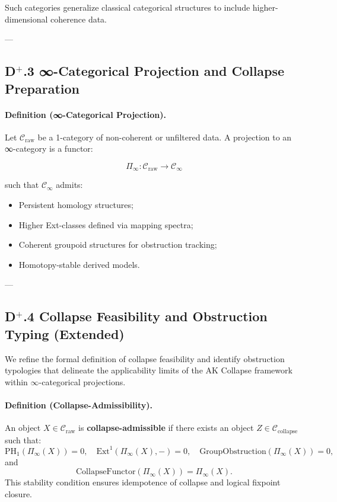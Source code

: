 \documentclass[11pt]{article}
\begin{document}
Such categories generalize classical categorical structures to include higher-dimensional coherence data.

---

\subsection*{D$^{+}$.3 ∞-Categorical Projection and Collapse Preparation}

\paragraph{Definition (∞-Categorical Projection).}

Let $\mathcal{C}_{\mathrm{raw}}$ be a 1-category of non-coherent or unfiltered data. A projection to an ∞-category is a functor:

\[
\Pi_\infty : \mathcal{C}_{\mathrm{raw}} \to \mathcal{C}_\infty
\]

such that $\mathcal{C}_\infty$ admits:

\begin{itemize}
    \item Persistent homology structures;
    \item Higher Ext-classes defined via mapping spectra;
    \item Coherent groupoid structures for obstruction tracking;
    \item Homotopy-stable derived models.
\end{itemize}

---

\subsection*{D$^{+}$.4 Collapse Feasibility and Obstruction Typing (Extended)}

We refine the formal definition of collapse feasibility and identify obstruction typologies that delineate the applicability limits of the AK Collapse framework within $\infty$-categorical projections.

\paragraph{Definition (Collapse-Admissibility).}

An object \( X \in \mathcal{C}_{\mathrm{raw}} \) is \textbf{collapse-admissible} if there exists an object \( Z \in \mathcal{C}_{\mathrm{collapse}} \) such that:
\[
\mathrm{PH}_1(\Pi_\infty(X)) = 0, \quad
\mathrm{Ext}^1(\Pi_\infty(X), -) = 0, \quad
\mathrm{GroupObstruction}(\Pi_\infty(X)) = 0,
\]
and
\[
\mathrm{CollapseFunctor}(\Pi_\infty(X)) = \Pi_\infty(X).
\]
This stability condition ensures idempotence of collapse and logical fixpoint closure.
\end{document}
